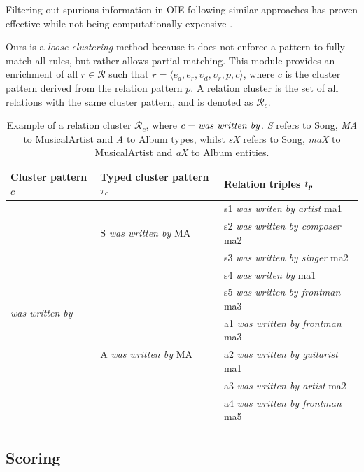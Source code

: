 Filtering out spurious information in OIE following similar approaches has proven effective while not being computationally expensive \cite{Fader2011}.

Ours is a \textit{loose clustering} method because it does not enforce a pattern to fully match all rules, but rather allows partial matching. This module provides an enrichment of all $r \in \mathcal{R}$ such that $r = \langle e_d, e_r, \upsilon_d, \upsilon_r, p, c\rangle$, where $c$ is the cluster pattern derived from the relation pattern $p$. A relation cluster is the set of all relations with the same cluster pattern, and is denoted as $\mathcal{R}_c$. 


\begin{table}[ht!]
\scriptsize
	\begin{tabular}{ | l | l | l | }
	\hline
\textbf{Cluster pattern $c$} & \textbf{Typed cluster pattern $ \tau_\textbf{\textit{c}}$} & \textbf{Relation triples $t_\textbf{\textit{p}}$} \\
\hline
\multirow{10}{*}{\textit{was written by}} & \multirow{3}{*}{S \textit{was written by} MA} & s1 \textit{was writen by artist} ma1 \\
\cline{3-3}
 &  & s2 \textit{was written by composer} ma2 \\
\cline{3-3}
 &  & s3 \textit{was written by singer} ma2 \\
\cline{3-3}
&  & s4 \textit{was writen by} ma1 \\
 \cline{3-3}
&  & s5 \textit{was written by frontman} ma3 \\
\cline{2-3}
& \multirow{3}{*}{A \textit{was written by} MA} & a1 \textit{was written by frontman} ma3 \\
 \cline{3-3}
&  & a2 \textit{was written by guitarist} ma1 \\
\cline{3-3}
&  & a3 \textit{was written by artist} ma2 \\
\cline{3-3}
&  & a4 \textit{was written by frontman} ma5 \\
    \hline
	\end{tabular}
	\caption{Example of a relation cluster $\mathcal{R}_c$, where $c = \mbox{\textit{was written by}}$. \textit{S} refers to Song, \textit{MA} to MusicalArtist and \textit{A} to Album types, whilst \textit{sX} refers to Song, \textit{maX} to MusicalArtist and \textit{aX} to Album entities.}
	\label{tbl:example_grouping}
\end{table}


\subsection{Scoring}
\label{sec:method:scoring}

